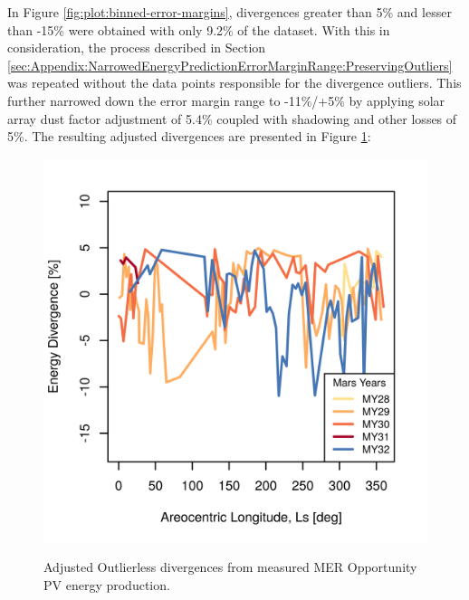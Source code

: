 In Figure \ref{fig:plot:binned-error-margins}, divergences greater than 5\% and lesser than -15\% were obtained with only 9.2\% of the dataset. With this in consideration, the process described in Section \ref{sec:Appendix:NarrowedEnergyPredictionErrorMarginRange:PreservingOutliers} was repeated without the data points responsible for the divergence outliers. This further narrowed down the error margin range to -11\%/+5\% by applying solar array dust factor adjustment of 5.4\% coupled with shadowing and other losses of 5\%. The resulting adjusted divergences are presented in Figure \ref{fig:plot:mer-energy-prediction-divergences-adjusted-without-outliers}:

\begin{figure}[h]
  \centering
  \hypersetup{linkcolor=captionTextColor}
  \includegraphics[width=0.8\linewidth]{sections/appendix/B/plots/energy-prediction-divergences-from-my28-to-my32-adjusted-without-outliers.png}\\
  \caption[Adjusted Outlierless divergences from measured \ac{MER} Opportunity PV energy production]
          {Adjusted Outlierless divergences from measured \ac{MER} Opportunity PV energy production.}
  \label{fig:plot:mer-energy-prediction-divergences-adjusted-without-outliers}
\end{figure}
